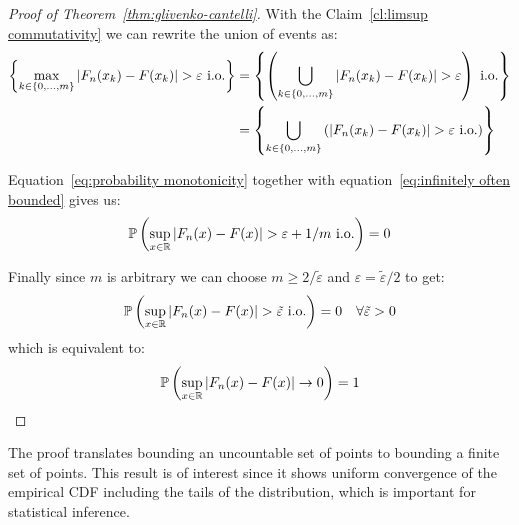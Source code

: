 \begin{proof}[Proof of Theorem~\ref{thm:glivenko-cantelli}]
    With the Claim~\ref{cl:limsup commutativity} we can rewrite the union of events as:
    \begin{align}    
        \left\{\max_{k \in \{0, ..., m\}} |F_n(x_k) - F(x_k)| > \varepsilon \text{ i.o.} \right\}
         & = \left\{\left(\bigcup_{k \in \{0, ..., m\}} |F_n(x_k) - F(x_k)| > \varepsilon \right) \text{ i.o.}\right\} \notag
        \\ &= \left\{\bigcup_{k \in \{0, ..., m\}} \left(|F_n(x_k) - F(x_k)| > \varepsilon \text{ i.o.} \right)\right\} \label{eq:infinitely often bounded}
    \end{align}
    
    Equation~\ref{eq:probability monotonicity} together with equation~\ref{eq:infinitely often bounded} gives us:
    \[\operatorname{\mathbb{P}} \left(\sup_{x \in \mathbb{R}}|F_n(x) - F(x)| > \varepsilon + 1/m \text{ i.o.}\right) = 0\]
    
    Finally since $m$ is arbitrary we can choose $m \geq 2 / \tilde{\varepsilon}$ and $\varepsilon = \tilde{\varepsilon} / 2$ to get:
    \[\operatorname{\mathbb{P}} \left(\sup_{x \in \mathbb{R}}|F_n(x) - F(x)| > \tilde{\varepsilon} \text{ i.o.}\right) = 0 \quad \forall \tilde{\varepsilon} > 0\]
    which is equivalent to:
    \[\operatorname{\mathbb{P}} \left(\sup_{x \in \mathbb{R}}|F_n(x) - F(x)| \to 0\right) = 1\]
\end{proof}

\begin{remark}    
    The proof translates bounding an uncountable set of points to bounding a finite set of points. This result is of interest since it shows uniform convergence of the empirical CDF including the tails of the distribution, which is important for statistical inference.
\end{remark}

